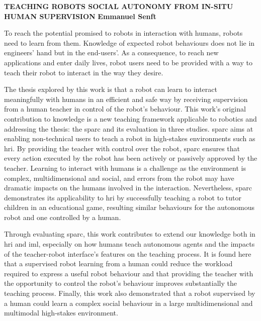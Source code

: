\textbf{TEACHING ROBOTS SOCIAL AUTONOMY FROM IN-SITU HUMAN SUPERVISION}\newline
\textbf{Emmanuel Senft}

To reach the potential promised to robots in interaction with humans, robots need to learn from them. Knowledge of expected robot behaviours does not lie in engineers' hand but in the end-users'. As a consequence, to reach new applications and enter daily lives, robot users need to be provided with a way to teach their robot to interact in the way they desire.

The thesis explored by this work is that a robot can learn to interact meaningfully with humans in an efficient and safe way by receiving supervision from a human teacher in control of the robot's behaviour. This work's original contribution to knowledge is a new teaching framework applicable to robotics and addressing the thesis: the \gls{sparc} and its evaluation in three studies. \gls{sparc} aims at enabling non-technical users to teach a robot in high-stakes environments such as \gls{hri}. By providing the teacher with control over the robot, \gls{sparc} ensures that every action executed by the robot has been actively or passively approved by the teacher. Learning to interact with humans is a challenge as the environment is complex, multidimensional and social, and errors from the robot may have dramatic impacts on the humans involved in the interaction. Nevertheless, \gls{sparc} demonstrates its applicability to \gls{hri} by successfully teaching a robot to tutor children in an educational game, resulting similar behaviours for the autonomous robot and one controlled by a human. 

Through evaluating \gls{sparc}, this work contributes to extend our knowledge both in \gls{hri} and \acrlong{iml}, especially on how humans teach autonomous agents and the impacts of the teacher-robot interface's features on the teaching process. It is found here that a supervised robot learning from a human could reduce the workload required to express a useful robot behaviour and that providing the teacher with the opportunity to control the robot's behaviour improves substantially the teaching process. Finally, this work also demonstrated that a robot supervised by a human could learn a complex social behaviour in a large multidimensional and multimodal high-stakes environment.

